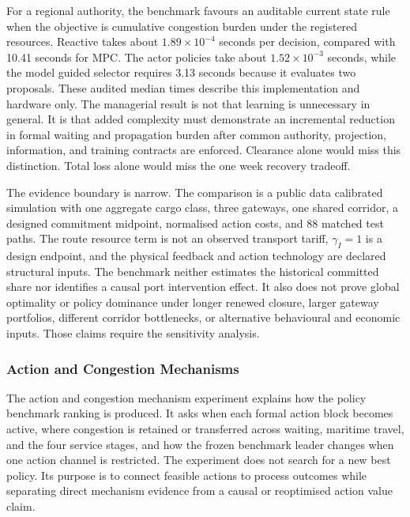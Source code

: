 \documentclass[a4paper,fleqn]{cas-sc}
\begin{document}
For a regional authority, the benchmark favours an auditable current state rule
when the objective is cumulative congestion burden under the registered
resources. Reactive takes about $1.89\times10^{-4}$ seconds per decision,
compared with 10.41 seconds for MPC. The actor policies take about
$1.52\times10^{-3}$ seconds, while the model guided selector requires 3.13
seconds because it evaluates two proposals. These audited median times describe this
implementation and hardware only. The managerial result is not that learning
is unnecessary in general. It is that added complexity must demonstrate an
incremental reduction in formal waiting and propagation burden after common
authority, projection, information, and training contracts are enforced.
Clearance alone would miss this distinction. Total loss alone would miss the
one week recovery tradeoff.

The evidence boundary is narrow. The comparison is a public data calibrated
simulation with one aggregate cargo class, three gateways, one shared corridor,
a designed commitment midpoint, normalised action costs, and 88 matched test
paths.
The route resource term is not an observed transport tariff, $\gamma_I=1$ is a
design endpoint, and the physical feedback and action technology are declared
structural inputs. The benchmark neither estimates the historical committed
share nor identifies a causal port intervention effect. It also does not prove
global optimality or policy dominance under longer renewed closure, larger
gateway portfolios, different corridor bottlenecks, or alternative behavioural
and economic inputs. Those claims require the sensitivity analysis.

\FloatBarrier

\subsubsection{Action and Congestion Mechanisms}
\label{subsubsec:action-congestion-mechanisms}

The action and congestion mechanism experiment explains how the policy benchmark ranking is
produced. It asks when each formal action block becomes active, where congestion
is retained or transferred across waiting, maritime travel, and the four service
stages, and how the frozen benchmark leader changes when one action channel is
restricted. The experiment does not search for a new best policy. Its purpose is
to connect feasible actions to process outcomes while separating direct
mechanism evidence from a causal or reoptimised action value claim.
\end{document}
